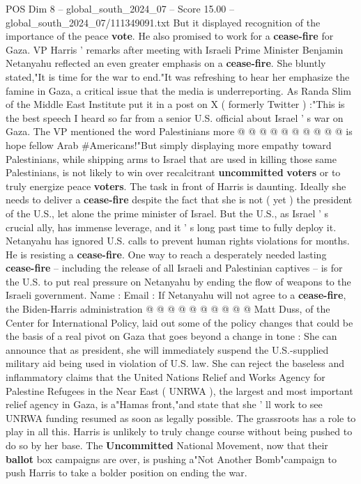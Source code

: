 \begin{textsample}{POS Dim 8 – global\_south\_2024\_07 – Score 15.00 – global\_south\_2024\_07/111349091.txt}
But it displayed recognition of the importance of the peace \textbf{vote}.
He also promised to work for a \textbf{cease-fire} for Gaza.
VP Harris ' remarks after meeting with Israeli Prime Minister Benjamin Netanyahu reflected an even greater emphasis on a \textbf{cease-fire}.
She bluntly stated,"It is time for the war to end."It was refreshing to hear her emphasize the famine in Gaza, a critical issue that the media is underreporting.
As Randa Slim of the Middle East Institute put it in a post on X ( formerly Twitter ) :"This is the best speech I heard so far from a senior U.S. official about Israel ' s war on Gaza.
The VP mentioned the word Palestinians more @ @ @ @ @ @ @ @ @ @ is hope fellow Arab \#Americans!"But simply displaying more empathy toward Palestinians, while shipping arms to Israel that are used in killing those same Palestinians, is not likely to win over recalcitrant \textbf{uncommitted} \textbf{voters} or to truly energize peace \textbf{voters}.
The task in front of Harris is daunting.
Ideally she needs to deliver a \textbf{cease-fire} despite the fact that she is not ( yet ) the president of the U.S., let alone the prime minister of Israel.
But the U.S., as Israel ' s crucial ally, has immense leverage, and it ' s long past time to fully deploy it.
Netanyahu has ignored U.S. calls to prevent human rights violations for months.
He is resisting a \textbf{cease-fire}.
One way to reach a desperately needed lasting \textbf{cease-fire} -- including the release of all Israeli and Palestinian captives -- is for the U.S. to put real pressure on Netanyahu by ending the flow of weapons to the Israeli government.
Name : Email : If Netanyahu will not agree to a \textbf{cease-fire}, the Biden-Harris administration @ @ @ @ @ @ @ @ @ @ Matt Duss, of the Center for International Policy, laid out some of the policy changes that could be the basis of a real pivot on Gaza that goes beyond a change in tone : She can announce that as president, she will immediately suspend the U.S.-supplied military aid being used in violation of U.S. law.
She can reject the baseless and inflammatory claims that the United Nations Relief and Works Agency for Palestine Refugees in the Near East ( UNRWA ), the largest and most important relief agency in Gaza, is a"Hamas front,"and state that she ' ll work to see UNRWA funding resumed as soon as legally possible.
The grassroots has a role to play in all this.
Harris is unlikely to truly change course without being pushed to do so by her base.
The \textbf{Uncommitted} National Movement, now that their \textbf{ballot} box campaigns are over, is pushing a"Not Another Bomb"campaign to push Harris to take a bolder position on ending the war.

\end{textsample}
